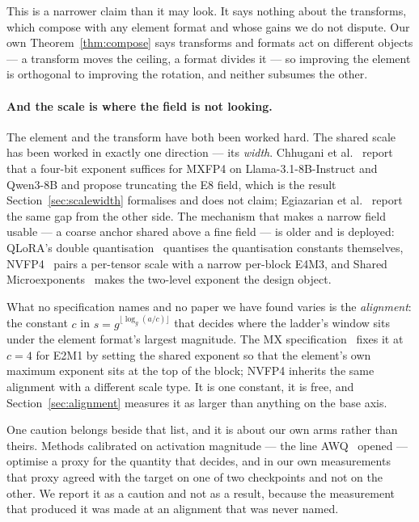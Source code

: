 \documentclass[11pt]{article}
\theoremstyle{definition}
\begin{document}
This is a narrower claim than it may look. It says nothing about the transforms,
which compose with any element format and whose gains we do not dispute. Our own
Theorem~\ref{thm:compose} says transforms and formats act on different objects ---
a transform moves the ceiling, a format divides it --- so improving the element is
orthogonal to improving the rotation, and neither subsumes the other.


\paragraph{And the scale is where the field is not looking.} The element and the
transform have both been worked hard. The shared scale has been worked in exactly
one direction --- its \emph{width}. Chhugani et al.~\cite{chhugani} report that a
four-bit exponent suffices for MXFP4 on Llama-3.1-8B-Instruct and Qwen3-8B and
propose truncating the E8 field, which is the result Section~\ref{sec:scalewidth}
formalises and does not claim; Egiazarian et al.~\cite{mxgap} report the same
gap from the other side. The mechanism that makes a narrow field usable --- a
coarse anchor shared above a fine field --- is older and is deployed: QLoRA's
double quantisation~\cite{qlora} quantises the quantisation constants themselves,
NVFP4~\cite{nvfp4} pairs a per-tensor scale with a narrow per-block E4M3, and
Shared Microexponents~\cite{msfp} makes the two-level exponent the design object.

What no specification names and no paper we have found varies is the
\emph{alignment}: the constant $c$ in $s = g^{\lfloor\log_g(a/c)\rfloor}$ that
decides where the ladder's window sits under the element format's largest
magnitude. The MX specification~\cite{ocpmx} fixes it at $c=4$ for E2M1 by
setting the shared exponent so that the element's own maximum exponent sits at
the top of the block; NVFP4 inherits the same alignment with a different scale
type. It is one constant, it is free, and Section~\ref{sec:alignment} measures it
as larger than anything on the base axis.

One caution belongs beside that list, and it is about our own arms rather than
theirs. Methods calibrated on activation magnitude --- the line AWQ~\cite{awq}
opened --- optimise a proxy for the quantity that decides, and in our own
measurements that proxy agreed with the target on one of two checkpoints and not
on the other. We report it as a caution and not as a result, because the
measurement that produced it was made at an alignment that was never named.
\end{document}

